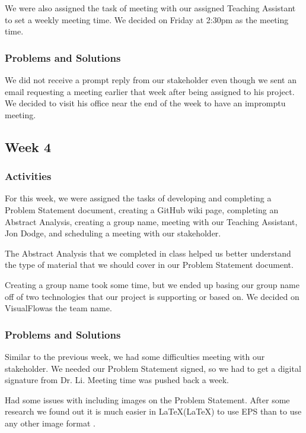 \documentclass[journal,10pt,onecolumn,compsoc]{IEEEtran} \usepackage[margin=1.0in]{geometry} \usepackage{pdfpages}
\begin{document}
\noindent We were also assigned the task of meeting with our assigned Teaching Assistant to set a weekly meeting time.
We decided on Friday at 2:30pm as the meeting time.

\subsubsection{Problems and Solutions}
We did not receive a prompt reply from our stakeholder even though we sent an email requesting a meeting earlier that week after being assigned to his project. We decided to visit his office near the end of the week to have an impromptu meeting.
\subsection{Week 4}
\subsubsection{Activities}
For this week, we were assigned the tasks of developing and completing a Problem Statement document, creating a GitHub wiki page, completing an Abstract Analysis, creating a group name, meeting with our Teaching Assistant, Jon Dodge, and scheduling a meeting with our stakeholder.

\noindent The Abstract Analysis that we completed in class helped us better understand the type of material that we should cover in our Problem Statement document.

\noindent Creating a group name took some time, but we ended up basing our group name off of two technologies that our project is supporting or based on. 
We decided on VisualFlow\texttrademark as the team name.

\subsubsection{Problems and Solutions}
Similar to the previous week, we had some difficulties meeting with our stakeholder. 
We needed our Problem Statement signed, so we had to get a digital signature from Dr. Li.
Meeting time was pushed back a week.

\noindent Had some issues with including images on the Problem Statement. 
After some research we found out it is much easier in LaTeX(\LaTeX) to use EPS than  to use any other image format .
\end{document}
